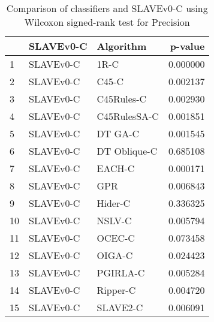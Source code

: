 \begin{table}
\footnotesize
\caption{Comparison of classifiers and SLAVEv0-C using Wilcoxon signed-rank test for Precision}
\label{tab:SLAVEv0-C wilcoxon Precision comparison}
\begin{tabular}{lllr}
\hline
 & SLAVEv0-C & Algorithm & p-value \\
\hline
1 & SLAVEv0-C & 1R-C & 0.000000 \\
2 & SLAVEv0-C & C45-C & 0.002137 \\
3 & SLAVEv0-C & C45Rules-C & 0.002930 \\
4 & SLAVEv0-C & C45RulesSA-C & 0.001851 \\
5 & SLAVEv0-C & DT GA-C & 0.001545 \\
6 & SLAVEv0-C & DT Oblique-C & 0.685108 \\
7 & SLAVEv0-C & EACH-C & 0.000171 \\
8 & SLAVEv0-C & GPR & 0.006843 \\
9 & SLAVEv0-C & Hider-C & 0.336325 \\
10 & SLAVEv0-C & NSLV-C & 0.005794 \\
11 & SLAVEv0-C & OCEC-C & 0.073458 \\
12 & SLAVEv0-C & OIGA-C & 0.024423 \\
13 & SLAVEv0-C & PGIRLA-C & 0.005284 \\
14 & SLAVEv0-C & Ripper-C & 0.004720 \\
15 & SLAVEv0-C & SLAVE2-C & 0.006091 \\
\hline
\end{tabular}
\end{table}
